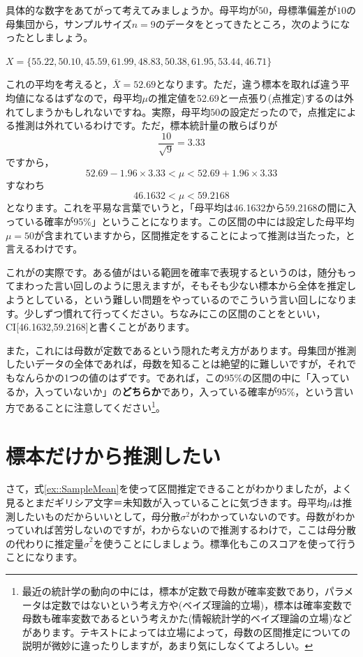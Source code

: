 \documentclass{ltjsbook}
\begin{document}
具体的な数字をあてがって考えてみましょうか。母平均が$50$，母標準偏差が$10$の母集団から，サンプルサイズ$n=9$のデータをとってきたところ，次のようになったとしましょう。
\begin{tcolorbox}
	$X = \{ 55.22, 50.10, 45.59, 61.99, 48.83, 50.38, 61.95, 53.44, 46.71\}$
\end{tcolorbox}
これの平均を考えると，$\bar{X}=52.69$となります。ただ，違う標本を取れば違う平均値になるはずなので，母平均$\mu$の推定値を52.69と一点張り(点推定)するのは外れてしまうかもしれないですね。実際，母平均$50$の設定だったので，点推定による推測は外れているわけです。ただ，標本統計量の散らばりが
\[\frac{10}{\sqrt{9}}=3.33\]
ですから，
\[ 52.69 - 1.96 \times 3.33 < \mu < 52.69+1.96\times 3.33 \]
すなわち
\[ 46.1632 < \mu < 59.2168\]
となります。これを平易な言葉でいうと，「母平均は46.1632から59.2168の間に入っている確率が95\%」ということになります。この区間の中には設定した母平均$\mu=50$が含まれていますから，区間推定をすることによって推測は当たった，と言えるわけです。

これがの実際です。ある値がはいる範囲を確率で表現するというのは，随分もってまわった言い回しのように思えますが，そもそも少ない標本から全体を推定しようとしている，という難しい問題をやっているのでこういう言い回しになります。少しずつ慣れて行ってください。ちなみにこの区間のことをといい，CI[46.1632,59.2168]と書くことがあります。


また，これには母数が定数であるという隠れた考え方があります。母集団が推測したいデータの全体であれば，母数を知ることは絶望的に難しいですが，それでもなんらかの1つの値のはずです。であれば，この95\%の区間の中に「入っているか，入っていないか」の\textbf{どちらか}であり，入っている確率が95\%，という言い方であることに注意してください\footnote{最近の統計学の動向の中には，標本が定数で母数が確率変数であり，パラメータは定数ではないという考え方や(ベイズ理論的立場)，標本は確率変数で母数も確率変数であるという考えかた(情報統計学的ベイズ理論の立場)などがあります。テキストによっては立場によって，母数の区間推定についての説明が微妙に違ったりしますが，あまり気にしなくてよろしい。}。

\section{標本だけから推測したい}
さて，式\ref{ex::SampleMean}を使って区間推定できることがわかりましたが，よく見るとまだギリシア文字＝未知数が入っていることに気づきます。母平均$\mu$は推測したいものだからいいとして，母分散$\sigma^2$がわかっていないのです。母数がわかっていれば苦労しないのですが，わからないので推測するわけで，ここは母分散の代わりに推定量$\hat{\sigma}^2$を使うことにしましょう。標準化もこのスコアを使って行うことになります。
\end{document}
